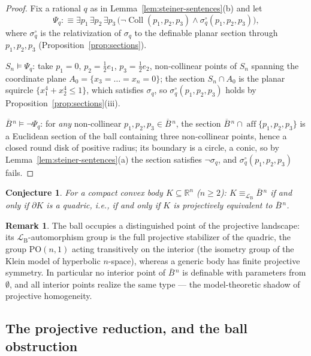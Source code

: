 \documentclass[11pt]{amsart}
\newtheorem{conjecture}[theorem]{Conjecture}
\theoremstyle{definition}
\newtheorem{remark}[theorem]{Remark}
\newcommand{\R}{\mathbb{R}}
\newcommand{\LB}{\mathcal{L}_{\mathrm{B}}}
\newcommand{\Coll}{\operatorname{Coll}}
\newcommand{\aff}{\operatorname{aff}}
\newcommand{\Ball}{\overline{B}{}^{\,n}}
\begin{document}
\begin{proof}
Fix a rational $q$ as in Lemma~\ref{lem:steiner-sentences}(b) and let
\[
\Psi_q:\equiv\exists p_1\,\exists p_2\,\exists p_3\,
\bigl(\neg\Coll(p_1,p_2,p_3)\wedge
\sigma_q^{\circ}(p_1,p_2,p_3)\bigr),
\]
where $\sigma_q^{\circ}$ is the relativization of $\sigma_q$ to the
definable planar section through $p_1,p_2,p_3$
(Proposition~\ref{prop:sections}).

$S_n\models\Psi_q$: take $p_1=0$, $p_2=\tfrac12e_1$, $p_3=\tfrac12e_2$,
non-collinear points of $S_n$ spanning the coordinate plane
$A_0=\{x_3=\dots=x_n=0\}$; the section $S_n\cap A_0$ is the planar squircle
$\{x_1^4+x_2^4\le1\}$, which satisfies $\sigma_q$, so
$\sigma_q^{\circ}(p_1,p_2,p_3)$ holds by
Proposition~\ref{prop:sections}(iii).

$\Ball\models\neg\Psi_q$: for \emph{any} non-collinear
$p_1,p_2,p_3\in\Ball$, the section $\Ball\cap\aff\{p_1,p_2,p_3\}$ is a
Euclidean section of the ball containing three non-collinear points, hence a
closed round disk of positive radius; its boundary is a circle, a conic, so
by Lemma~\ref{lem:steiner-sentences}(a) the section satisfies
$\neg\sigma_q$, and $\sigma_q^{\circ}(p_1,p_2,p_3)$ fails.
\end{proof}

\begin{conjecture}\label{conj:ball-LB}
For a compact convex body $K\subseteq\R^n$ \textup($n\ge2$\textup):\;
$K\equiv_{\LB}\Ball$ if and only if $\partial K$ is a quadric, i.e., if and
only if $K$ is projectively equivalent to $\Ball$.
\end{conjecture}

\begin{remark}
The ball occupies a distinguished point of the projective landscape: its
$\LB$-automorphism group is the full projective stabilizer of the quadric,
the group $\mathrm{PO}(n,1)$ acting transitively on the interior (the
isometry group of the Klein model of hyperbolic $n$-space), whereas a
generic body has finite projective symmetry. In particular no interior point
of $\Ball$ is definable with parameters from $\emptyset$, and all interior
points realize the same type --- the model-theoretic shadow of projective
homogeneity.
\end{remark}

\subsection{The projective reduction, and the ball obstruction}
\label{subsec:projective-reduction}
\end{document}
